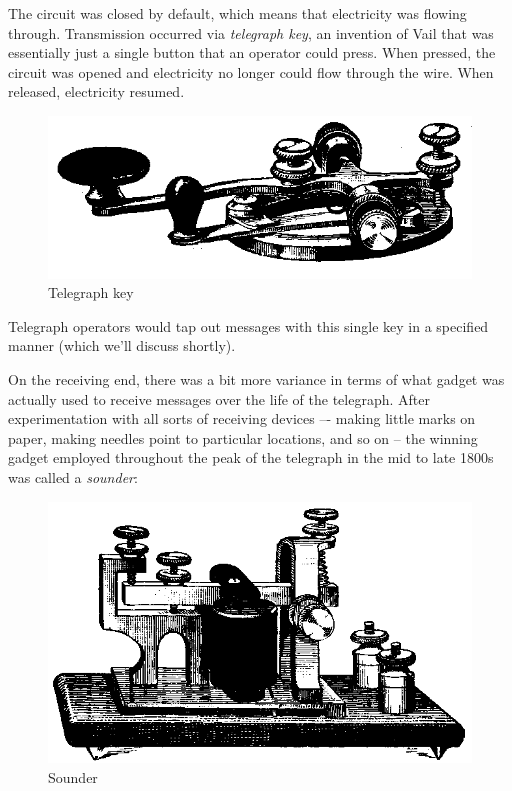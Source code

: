 \documentclass[UTF8]{book}
\begin{document}
\begin{CJK}{UTF8}{gbsn}
The circuit was closed by default, which means that electricity was flowing through. Transmission occurred via \emph{telegraph key}, an invention of Vail that was essentially just a single button that an operator could press. When pressed, the circuit was opened and electricity no longer could flow through the wire. When released, electricity resumed.

\begin{figure}[H]
\centering
\includegraphics[width=1.0\linewidth]{telegraphkey}
\caption{Telegraph key}
\end{figure}

Telegraph operators would tap out messages with this single key in a specified manner (which we'll discuss shortly).

On the receiving end, there was a bit more variance in terms of what gadget was actually used to receive messages over the life of the telegraph. After experimentation with all sorts of receiving devices –- making little marks on paper, making needles point to particular locations, and so on -- the winning gadget employed throughout the peak of the telegraph in the mid to late 1800s was called a \emph{sounder}:

\begin{figure}[H]
\centering
\includegraphics[width=0.8\linewidth]{telegraphsounder}
\caption{Sounder}
\end{figure}



\end{CJK}
\end{document}
